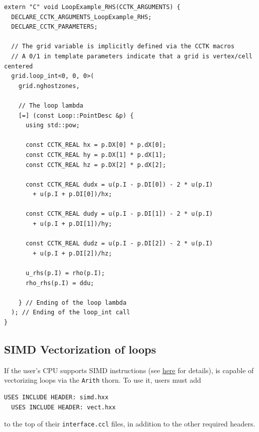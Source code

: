 \begin{lstlisting}
extern "C" void LoopExample_RHS(CCTK_ARGUMENTS) {
  DECLARE_CCTK_ARGUMENTS_LoopExample_RHS;
  DECLARE_CCTK_PARAMETERS;

  // The grid variable is implicitly defined via the CCTK macros
  // A 0/1 in template parameters indicate that a grid is vertex/cell centered
  grid.loop_int<0, 0, 0>(
    grid.nghostzones,

    // The loop lambda
    [=] (const Loop::PointDesc &p) {
      using std::pow;

      const CCTK_REAL hx = p.DX[0] * p.dX[0];
      const CCTK_REAL hy = p.DX[1] * p.dX[1];
      const CCTK_REAL hz = p.DX[2] * p.dX[2];
      
      const CCTK_REAL dudx = u(p.I - p.DI[0]) - 2 * u(p.I) 
        + u(p.I + p.DI[0])/hx;

      const CCTK_REAL dudy = u(p.I - p.DI[1]) - 2 * u(p.I) 
        + u(p.I + p.DI[1])/hy;

      const CCTK_REAL dudz = u(p.I - p.DI[2]) - 2 * u(p.I) 
        + u(p.I + p.DI[2])/hz;

      u_rhs(p.I) = rho(p.I);
      rho_rhs(p.I) = ddu;

    } // Ending of the loop lambda
  ); // Ending of the loop_int call
}
\end{lstlisting}

\subsection{SIMD Vectorization of loops}

If the user's CPU supports SIMD instructions (see \href{https://en.wikipedia.org/wiki/Single_instruction,_multiple_data}{here} for details), \CarpetX\space is capable of vectorizing loops via the \texttt{Arith} thorn. To use it, users must add
%
\begin{lstlisting}[language=bash]
  USES INCLUDE HEADER: simd.hxx
  USES INCLUDE HEADER: vect.hxx
\end{lstlisting}
%
to the top of their \texttt{interface.ccl} files, in addition to the other required headers.

